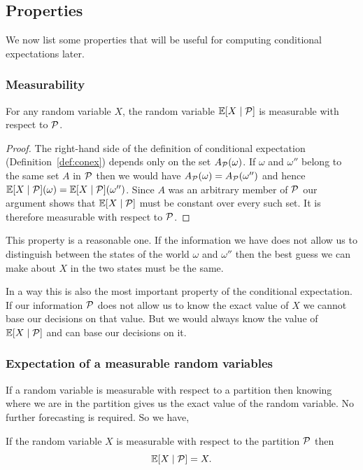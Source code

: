 \documentclass[11pt,reqno,openany]{amsbook}
\begin{document}
\subsection{Properties}
We now list some properties that will be useful for
computing conditional expectations later.

\subsubsection{Measurability}
\begin{prop}
  For any random variable $X$, the random variable $\mathbb{E}[X
  \mid \mathcal{P}]$ is measurable with respect to
  $\mathcal{P}$.
\end{prop}
\begin{proof}
  The right-hand side of the definition of conditional
  expectation (Definition~\ref{def:conex}) depends only on
  the set $A_{\mathcal{P}}(\omega)$. If $\omega$ and
  $\omega''$ belong to the same set $A$ in $\mathcal{P}$ then
  we would have
  $A_{\mathcal{P}}(\omega)=A_{\mathcal{P}}(\omega'')$ and
  hence $\mathbb{E}[X \mid \mathcal{P}](\omega)=\mathbb{E}[X \mid
  \mathcal{P}](\omega'')$. Since $A$ was an arbitrary member
  of $\mathcal{P}$ our argument shows that $\mathbb{E}[X \mid
  \mathcal{P}]$ must be constant over every such set. It is
  therefore measurable with respect to $\mathcal{P}$.
\end{proof}

This property is a reasonable one. If the information we
have does not allow us to distinguish between the states of
the world $\omega$ and $\omega''$ then the best guess we can
make about $X$ in the two states must be the same.

In a way this is also the most important property of the
conditional expectation. If our information $\mathcal{P}$
does not allow us to know the exact value of $X$ we cannot
base our decisions on that value. But we would always know
the value of $\mathbb{E}[X \mid \mathcal{P}]$ and can base our
decisions on it.

\subsubsection{Expectation of a measurable random variables}
If a random variable is measurable with respect to a
partition then knowing where we are in the partition gives
us the exact value of the random variable. No further
forecasting is required. So we have,
\begin{prop}\label{prop:conex-measure}
  If the random variable $X$ is measurable with respect to
  the partition $\mathcal{P}$ then
  \[\mathbb{E}[X\mid \mathcal{P}]=X.\]
\end{prop}
\end{document}

